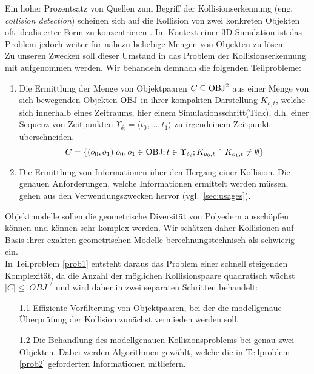\label{ref:problem_def}
Ein hoher Prozentsatz von Quellen zum Begriff der Kollisionserkennung (eng. \textit{collision detection}) scheinen sich auf die Kollision von zwei konkreten Objekten oft idealisierter Form zu konzentrieren \cites[ch.12]{fourcrossfour}{gjk}{gdc-physics}.
Im Kontext einer 3D-Simulation ist das Problem jedoch weiter für nahezu beliebige Mengen von Objekten zu lösen.\\
Zu unseren Zwecken soll dieser Umstand in das Problem der Kollisionserkennung mit aufgenommen werden. Wir behandeln demnach die folgenden Teilprobleme:
\begin{enumerate}
\item \label{prob1}Die Ermittlung der Menge von Objektpaaren $C \subseteq \operatorname{OBJ}^2$ aus einer Menge von sich bewegenden Objekten $\operatorname{OBJ}$ in ihrer kompakten Darstellung $K_{o,t}$, welche sich innerhalb eines Zeitraums, hier einem Simulationsschritt(Tick), d.h. einer Sequenz von Zeitpunkten $\Upsilon_{\delta_i} = \langle t_0 , ... , t_1 \rangle$ zu irgendeinem Zeitpunkt überschneiden.
$$C = \{(o_0, o_1) | o_0, o_1 \in \operatorname{OBJ}; t\in \Upsilon_{\delta_i}; K_{o_0, t} \cap K_{o_1, t} \neq \emptyset\}$$
\item \label{prob2}Die Ermittlung von Informationen über den Hergang einer Kollision.
Die genauen Anforderungen, welche Informationen ermittelt werden müssen, gehen aus den Verwendungszwecken hervor (vgl.~\ref{sec:usages}). 
\end{enumerate}

Objektmodelle sollen die geometrische Diversität von Polyedern ausschöpfen können und können sehr komplex werden. Wir schätzen daher Kollisionen auf Basis ihrer exakten geometrischen Modelle berechnungstechnisch als schwierig ein.\\
In Teilproblem \ref{prob1} entsteht daraus das Problem einer schnell steigenden Komplexität, da die Anzahl der möglichen Kollisionspaare quadratisch wächst $|C|\leq |OBJ|^2$ und wird daher in zwei separaten Schritten behandelt:
\begin{itemize}
\item[1.1] Effiziente Vorfilterung von Objektpaaren, bei der die modellgenaue Überprüfung der Kollision zunächst vermieden werden soll.
\item[1.2] Die Behandlung des modellgenauen Kollisionsproblems bei genau zwei Objekten. Dabei werden Algorithmen gewählt, welche die in Teilproblem \ref{prob2} geforderten Informationen mitliefern.
\end{itemize}
